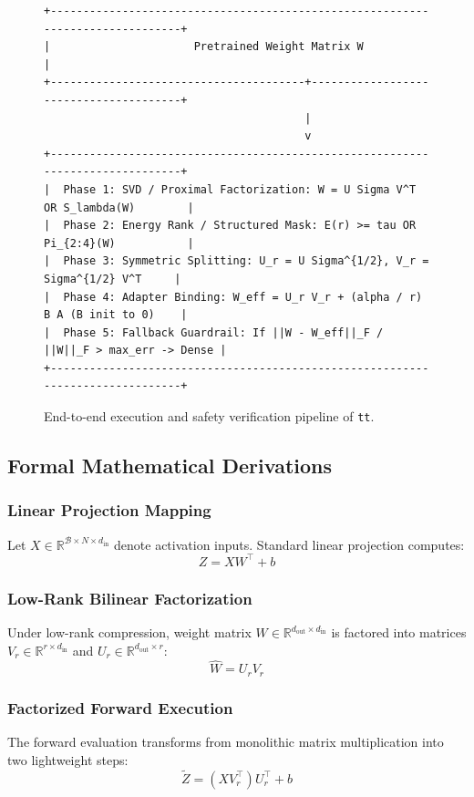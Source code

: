 \begin{figure}[t]
\centering
\begin{verbatim}
+-------------------------------------------------------------------------------+
|                      Pretrained Weight Matrix W                               |
+---------------------------------------+---------------------------------------+
                                        |
                                        v
+-------------------------------------------------------------------------------+
|  Phase 1: SVD / Proximal Factorization: W = U Sigma V^T OR S_lambda(W)        |
|  Phase 2: Energy Rank / Structured Mask: E(r) >= tau OR Pi_{2:4}(W)           |
|  Phase 3: Symmetric Splitting: U_r = U Sigma^{1/2}, V_r = Sigma^{1/2} V^T     |
|  Phase 4: Adapter Binding: W_eff = U_r V_r + (alpha / r) B A (B init to 0)    |
|  Phase 5: Fallback Guardrail: If ||W - W_eff||_F / ||W||_F > max_err -> Dense |
+-------------------------------------------------------------------------------+
\end{verbatim}
\caption{End-to-end execution and safety verification pipeline of \texttt{tt}.}
\end{figure}

\subsection{Formal Mathematical Derivations}

\subsubsection{Linear Projection Mapping}
Let $X \in \mathbb{R}^{\mathcal{B} \times N \times d_{\text{in}}}$ denote activation inputs. Standard linear projection computes:
\[
Z = X W^\top + b
\]

\subsubsection{Low-Rank Bilinear Factorization}
Under low-rank compression, weight matrix $W \in \mathbb{R}^{d_{\text{out}} \times d_{\text{in}}}$ is factored into matrices $V_r \in \mathbb{R}^{r \times d_{\text{in}}}$ and $U_r \in \mathbb{R}^{d_{\text{out}} \times r}$:
\[
\hat{W} = U_r V_r
\]

\subsubsection{Factorized Forward Execution}
The forward evaluation transforms from monolithic matrix multiplication into two lightweight steps:
\[
\tilde{Z} = (X V_r^\top) U_r^\top + b
\]

